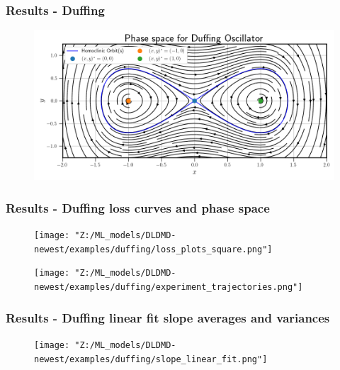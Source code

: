 \documentclass[11pt,aspectratio=169]{beamer}
\begin{document}
    \begin{frame}
        \frametitle{Results - Duffing}
        \begin{figure}
            \centering
            \includegraphics[width=\textwidth]{../Figures/duffing_phase_space.png}
        \end{figure}
    \end{frame}

    \begin{frame}
        \frametitle{Results - Duffing loss curves and phase space}
        \begin{figure}
            \centering
            \begin{minipage}{.5\textwidth}
                \texttt{[image: "Z:/ML\_models/DLDMD-newest/examples/duffing/loss\_plots\_square.png"]}
            \end{minipage}%
            \begin{minipage}{.5\textwidth}
                \texttt{[image: "Z:/ML\_models/DLDMD-newest/examples/duffing/experiment\_trajectories.png"]}
            \end{minipage}
        \end{figure}
    \end{frame}
    
    \begin{frame}
        \frametitle{Results - Duffing linear fit slope averages and variances}
        \begin{figure}
            \centering
            \texttt{[image: "Z:/ML\_models/DLDMD-newest/examples/duffing/slope\_linear\_fit.png"]}
        \end{figure}
    \end{frame}
\end{document}
